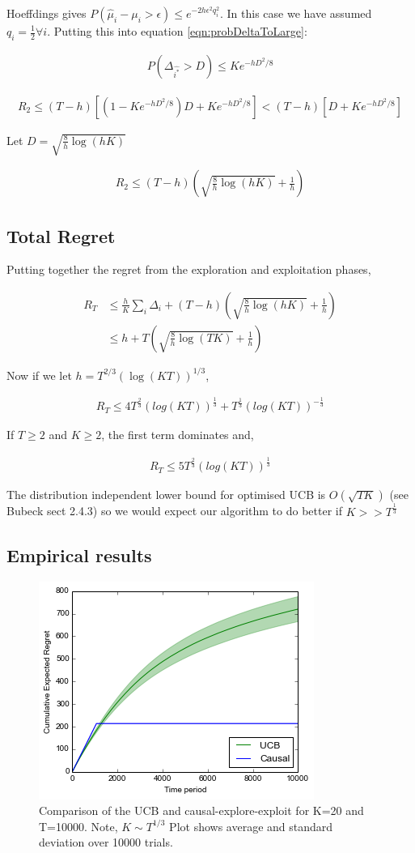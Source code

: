\documentclass{article}
\newcommand{\eqn}[1]{\begin{align}#1\end{align}}
\theoremstyle{plain}
\theoremstyle{definition}
\begin{document}
Hoeffdings gives $ P(\hat{\mu}_i - \mu_{i} > \epsilon) \leq e^{-2h\epsilon^2q_i^2}$. In this case we have assumed $q_i = \frac{1}{2} \forall i$. Putting this into equation \ref{eqn:probDeltaToLarge}:

\eqn{
\label{eqn:balancedHoeffdings}
P(\Delta_{\hat{i^*}} > D) \leq Ke^{-hD^2/8}
}


\eqn{
R_2 \leq (T-h)[(1-K e^{-hD^2/8})D + K e^{-hD^2/8}] < (T-h)[D + K e^{-hD^2/8}]
}

Let $D = \sqrt{\frac{8}{h}\log(hK)}$ 

\eqn{
R_2 \leq (T-h)\left(\sqrt{\frac{8}{h}\log(hK)} + \frac{1}{h}\right)
}


\subsection*{Total Regret}

Putting together the regret from the exploration and exploitation phases,

\eqn{
R_T & \leq \frac{h}{K}\sum_i \Delta_i + (T-h)\left(\sqrt{\frac{8}{h}\log(hK)} + \frac{1}{h}\right)\\
& \leq h + T\left(\sqrt{\frac{8}{h}\log(TK)} + \frac{1}{h}\right)
}

Now if we let $h = T^{2/3}(\log(KT))^{1/3}$,


\eqn {
R_T \leq 4T^{\frac{2}{3}}(log(KT))^{\frac{1}{3}} + T^{\frac{1}{3}}(log(KT))^{-\frac{1}{3}}
}

If $T \geq 2$ and $K \geq 2$, the first term dominates and,

\eqn {
R_T  \leq 5T^{\frac{2}{3}}(log(KT))^{\frac{1}{3}}
}

The distribution independent lower bound for optimised UCB is $O(\sqrt{TK})$ (see Bubeck sect 2.4.3) so we would expect our algorithm to do better if $K >> T^{\frac{1}{3}}$



\subsection*{Empirical results}
\begin{figure}[H]
\centering
\caption{Comparison of the UCB and causal-explore-exploit for K=20 and T=10000. Note, $K \sim T^{1/3}$ Plot shows average and standard deviation over 10000 trials.}
\includegraphics[width=.5\textwidth]{explore_exploit}
\end{figure}
\end{document}
